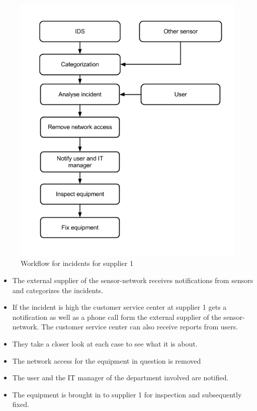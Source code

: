 \begin{figure}[H]
\begin{center}
\includegraphics[scale=0.54]{WorkflowCaseBSupplier1.png}
\caption[Workflow for incidents, Case B Supplier 1]{Workflow for incidents for supplier 1}
\label{fig:WorkflowCaseBSupplier1}
\end{center}
\end{figure}

\begin{itemize}
\item The external supplier of the sensor-network receives notifications from sensors and categorizes the incidents.
\item If the incident is high the customer service center at supplier 1 gets a notification as well as a phone call form the external supplier of the sensor-network. The customer service center can also receive reports from users.
\item They take a closer look at each case to see what it is about.
\item The network access for the equipment in question is removed 
\item The user and the IT manager of the department involved are notified.
\item The equipment is brought in to supplier 1 for inspection and subsequently fixed.
\end{itemize}

